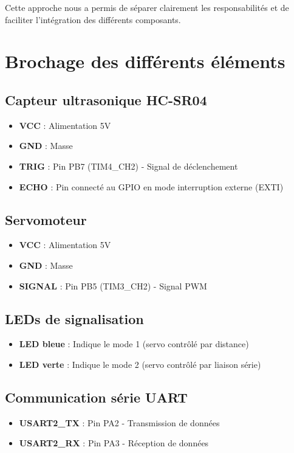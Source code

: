 \documentclass{article}
\begin{document}
Cette approche nous a permis de séparer clairement les responsabilités et de faciliter l'intégration des différents composants.

\section{Brochage des différents éléments}

\subsection{Capteur ultrasonique HC-SR04}
\begin{itemize}
    \item \textbf{VCC} : Alimentation 5V
    \item \textbf{GND} : Masse
    \item \textbf{TRIG} : Pin PB7 (TIM4\_CH2) - Signal de déclenchement
    \item \textbf{ECHO} : Pin connecté au GPIO en mode interruption externe (EXTI)
\end{itemize}

\subsection{Servomoteur}
\begin{itemize}
    \item \textbf{VCC} : Alimentation 5V
    \item \textbf{GND} : Masse
    \item \textbf{SIGNAL} : Pin PB5 (TIM3\_CH2) - Signal PWM
\end{itemize}

\subsection{LEDs de signalisation}
\begin{itemize}
    \item \textbf{LED bleue} : Indique le mode 1 (servo contrôlé par distance)
    \item \textbf{LED verte} : Indique le mode 2 (servo contrôlé par liaison série)
\end{itemize}

\subsection{Communication série UART}
\begin{itemize}
    \item \textbf{USART2\_TX} : Pin PA2 - Transmission de données
    \item \textbf{USART2\_RX} : Pin PA3 - Réception de données
\end{itemize}
\end{document}
